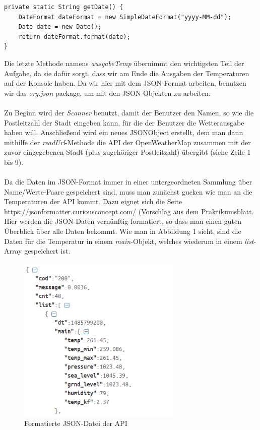 \begin{lstlisting}[caption={getDate-Methode}]
private static String getDate() {
	DateFormat dateFormat = new SimpleDateFormat("yyyy-MM-dd");
	Date date = new Date();
	return dateFormat.format(date);
}
\end{lstlisting}

Die letzte Methode namens \textit{ausgabeTemp} übernimmt den wichtigsten Teil der Aufgabe, da sie dafür sorgt, dass wir am Ende die Ausgaben der Temperaturen auf der Konsole haben. Da wir hier mit dem JSON-Format arbeiten, benutzen wir das \textit{org.json}-package, um mit den JSON-Objekten zu arbeiten.\cite{[2]} \\
\\
Zu Beginn wird der \textit{Scanner} benutzt, damit der Benutzer den Namen, so wie die Postleitzahl der Stadt eingeben kann, für die der Benutzer die Wetterausgabe haben will. Anschließend wird ein neues JSONObject erstellt, dem man dann mithilfe der \textit{readUrl}-Methode die API der OpenWeatherMap zusammen mit der zuvor eingegebenen Stadt (plus zugehöriger Postleitzahl) übergibt (siehe Zeile 1 bis 9). \\
\\
Da die Daten im JSON-Format immer in einer untergeordneten Sammlung über Name/Werte-Paare gespeichert sind, muss man zunächst gucken wie man an die Temperaturen der API kommt. Dazu eignet sich die Seite \url{https://jsonformatter.curiousconcept.com/} (Vorschlag aus dem Praktikumsblatt. Hier werden die JSON-Daten vernünftig formatiert, so dass man einen guten Überblick über alle Daten bekommt. Wie man in Abbildung 1 sieht, sind die Daten für die Temperatur in einem \textit{main}-Objekt, welches wiederum in einem \textit{list}-Array gespeichert ist. 

\begin{figure}[htbp]
\begin{center}
\includegraphics[width=0.7\textwidth]{Bild1}
\caption{Formatierte JSON-Datei der API}
\end{center}
\end{figure}

